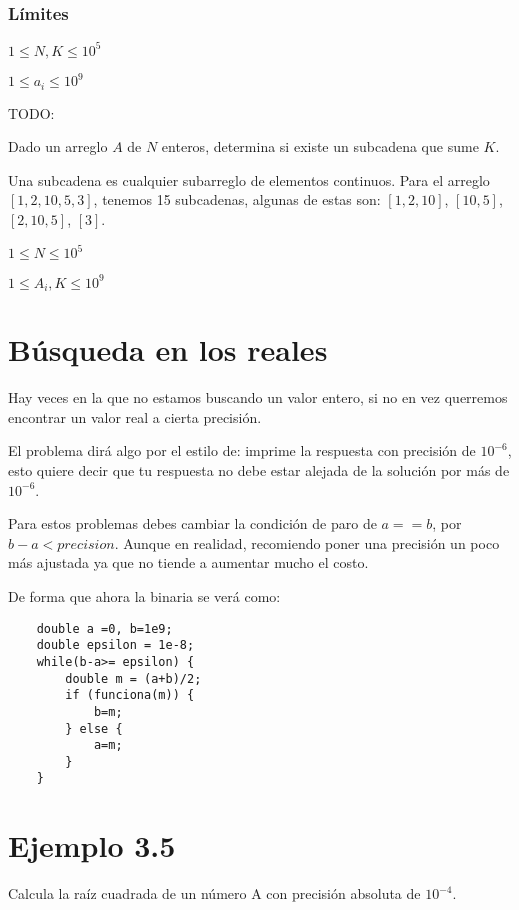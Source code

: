 \subsubsection*{Límites}
\begin{plimits}
	\item \(1\leq N, K \leq 10^5\)
	\item \(1\leq a_i \leq 10^9\)
\end{plimits}
TODO:

\problembreak

\problemtitle Dado un arreglo \(A\) de \(N\) enteros, determina si existe un subcadena que sume \(K\).

Una subcadena es cualquier subarreglo de elementos continuos. Para el arreglo \([1, 2, 10, 5, 3]\), tenemos 15 subcadenas, algunas de estas son: \([1,2,10]\),
\([10,5]\), \([2,10,5]\), \([3]\).
\begin{plimits}
	\item \(1\leq N \leq 10^5\)
	\item \(1\leq A_i, K \leq 10^9\)
\end{plimits}


\newpage
\section*{Búsqueda en los reales}

Hay veces en la que no estamos buscando un valor entero, si no en vez querremos encontrar un valor real a cierta precisión.

El problema dirá algo por el estilo de: imprime la respuesta con precisión de \(10^{-6}\), esto quiere decir que tu respuesta no debe estar alejada de la solución por más de \(10^{-6}\).

Para estos problemas debes cambiar la condición de paro de \(a==b\), por \(b-a < precision\). Aunque en realidad, recomiendo poner una precisión un poco más ajustada ya que no tiende a aumentar mucho el costo.

De forma que ahora la binaria se verá como:

\begin{lstlisting}
	double a =0, b=1e9;
	double epsilon = 1e-8;
	while(b-a>= epsilon) {
		double m = (a+b)/2;
		if (funciona(m)) {
			b=m;
		} else {
			a=m;
		}
	}
\end{lstlisting}

\section*{Ejemplo 3.5}
Calcula la raíz cuadrada de un número A con precisión absoluta de \(10^{-4}\).
